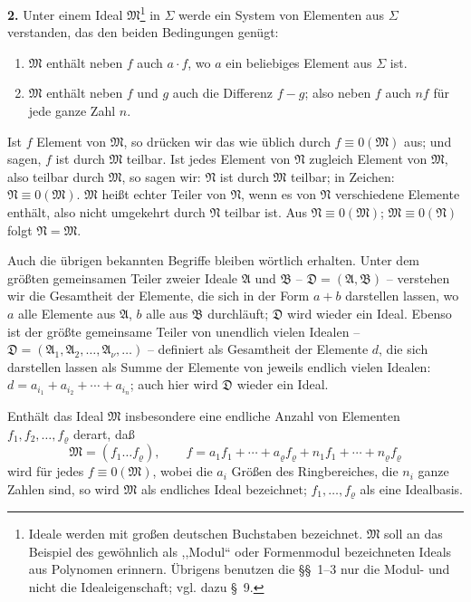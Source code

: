 \documentclass[11pt]{article}
\newcommand{\ideal}[1]{\mathfrak{#1}}
\begin{document}
\textbf{2.} Unter einem Ideal $\ideal M$\footnote{Ideale werden mit großen deutschen Buchstaben bezeichnet. $\ideal M$ soll an das Beispiel des gewöhnlich als ,,Modul`` oder Formenmodul bezeichneten Ideals aus Polynomen erinnern. Übrigens benutzen die \S\S~1--3 nur die Modul- und nicht die Idealeigenschaft; vgl. dazu \S~9.} in $\Sigma$ werde ein System von Elementen aus $\Sigma$ verstanden, das den beiden Bedingungen genügt:
\begin{enumerate}
\item $\ideal M$ enthält neben $f$ auch $a\cdot f$, wo $a$ ein beliebiges Element aus $\Sigma$ ist.
\item $\ideal M$ enthält neben $f$ und $g$ auch die Differenz $f-g$; also neben $f$ auch $nf$ für jede ganze Zahl $n$.
\end{enumerate}
Ist $f$ Element von $\ideal M$, so drücken wir das wie üblich durch $f\equiv0(\ideal M)$ aus; und sagen, $f$ ist durch $\ideal M$ teilbar. Ist jedes Element von $\ideal N$ zugleich Element von $\ideal M$, also teilbar durch $\ideal M$, so sagen wir: $\ideal N$ ist durch $\ideal M$ teilbar; in Zeichen: $\ideal N\equiv0(\ideal M)$. $\ideal M$ heißt echter Teiler von $\ideal N$, wenn es von $\ideal N$ verschiedene Elemente enthält, also nicht umgekehrt durch $\ideal N$ teilbar ist. Aus $\ideal N\equiv0(\ideal M)$; $\ideal M\equiv0(\ideal N)$ folgt $\ideal N=\ideal M$.

Auch die übrigen bekannten Begriffe bleiben wörtlich erhalten. Unter dem größten gemeinsamen Teiler zweier Ideale $\ideal A$ und $\ideal B$ -- $\ideal D=(\ideal A,\ideal B)$ -- verstehen wir die Gesamtheit der Elemente, die sich in der Form $a+b$ darstellen lassen, wo $a$ alle Elemente aus $\ideal A$, $b$ alle aus $\ideal B$ durchläuft; $\ideal D$ wird wieder ein Ideal. Ebenso ist der größte gemeinsame Teiler von unendlich vielen Idealen -- $\ideal D=(\ideal A_1,\ideal A_2,\ldots,\ideal A_\nu,\ldots)$ -- definiert als Gesamtheit der Elemente $d$, die sich darstellen lassen als Summe der Elemente von jeweils endlich vielen Idealen: $d=a_{i_1}+a_{i_2}+\cdots+a_{i_n}$; auch hier wird $\ideal D$ wieder ein Ideal.

Enthält das Ideal $\ideal M$ insbesondere eine endliche Anzahl von Elementen $f_1,f_2,\ldots,f_\varrho$ derart, daß
\[
 \ideal M=(f_1\ldots f_\varrho),\qquad
 f=a_1f_1+\cdots+a_\varrho f_\varrho+n_1f_1+\cdots+n_\varrho f_\varrho
\]
wird für jedes $f\equiv0(\ideal M)$, wobei die $a_i$ Größen des Ringbereiches, die $n_i$ ganze Zahlen sind, so wird $\ideal M$ als endliches Ideal bezeichnet; $f_1,\ldots,f_\varrho$ als eine Idealbasis.
\end{document}

